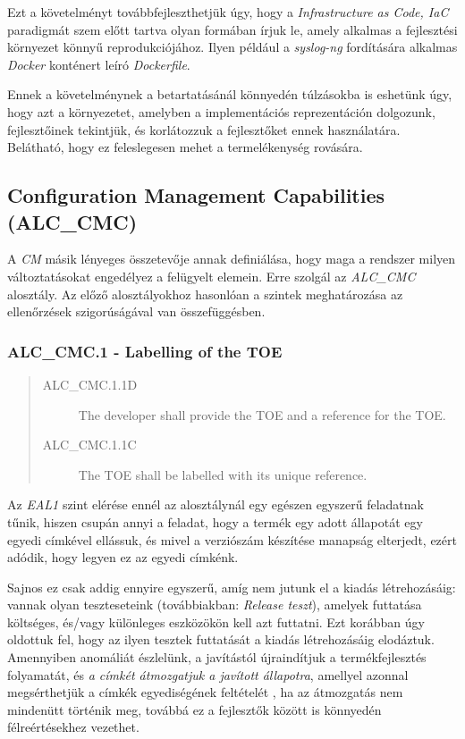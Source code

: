 Ezt a követelményt továbbfejleszthetjük úgy, hogy a \emph{Infrastructure as Code, IaC}
\cite{huttermann2012infrastructure} paradigmát szem előtt tartva olyan formában írjuk le, amely
alkalmas a fejlesztési környezet könnyű reprodukciójához. Ilyen például a \emph{syslog-ng}
fordítására alkalmas \emph{Docker} konténert leíró \emph{Dockerfile}. \cite{syslogngenv}

Ennek a követelménynek a betartatásánál könnyedén túlzásokba is eshetünk úgy, hogy azt
a környezetet, amelyben a implementációs reprezentáción dolgozunk, fejlesztőinek tekintjük, és
korlátozzuk a fejlesztőket ennek használatára. Belátható, hogy ez feleslegesen mehet
a termelékenység rovására.

\pagebreak[3]
\subsection{Configuration Management Capabilities (ALC\_CMC)}

A \emph{CM} másik lényeges összetevője annak definiálása, hogy maga a rendszer milyen
változtatásokat engedélyez a felügyelt elemein. Erre szolgál az \emph{ALC\_CMC} alosztály.
Az előző alosztályokhoz hasonlóan a szintek meghatározása az ellenőrzések szigorúságával van
összefüggésben.

\subsubsection{ALC\_CMC.1 - Labelling of the TOE}
\begin{quote}
    \begin{description}
        \item[ALC\_CMC.1.1D]{The developer shall provide the TOE and a reference for the TOE.}
        \item[ALC\_CMC.1.1C]{The TOE shall be labelled with its unique reference.}
    \end{description}
\end{quote}

Az \emph{EAL1} szint elérése ennél az alosztálynál egy egészen egyszerű feladatnak tűnik, hiszen
csupán annyi a feladat, hogy a termék egy adott állapotát egy egyedi címkével ellássuk, és mivel
a verziószám készítése manapság elterjedt, ezért adódik, hogy legyen ez az egyedi címkénk.

Sajnos ez csak addig ennyire egyszerű, amíg nem jutunk el a kiadás létrehozásáig: vannak olyan
teszteseteink (továbbiakban: \emph{Release teszt}), amelyek futtatása költséges, és/vagy különleges
eszközökön kell azt futtatni. Ezt korábban úgy oldottuk fel, hogy az ilyen tesztek futtatását
a kiadás létrehozásáig elodáztuk.  Amennyiben anomáliát észlelünk, a javítástól újraindítjuk
a termékfejlesztés folyamatát, és \emph{a címkét átmozgatjuk a javított állapotra}, amellyel azonnal
megsérthetjük a címkék egyediségének feltételét , ha az átmozgatás nem mindenütt történik meg,
továbbá ez a fejlesztők között is könnyedén félreértésekhez vezethet.


